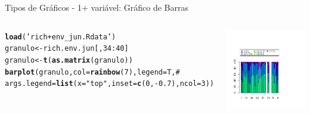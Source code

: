\documentclass{beamer}\usepackage[]{graphicx}\usepackage[]{color}
\makeatletter
\newcommand{\hlnum}[1]{\textcolor[rgb]{0.686,0.059,0.569}{#1}}%
\newcommand{\hlstr}[1]{\textcolor[rgb]{0.192,0.494,0.8}{#1}}%
\newcommand{\hlcom}[1]{\textcolor[rgb]{0.678,0.584,0.686}{\textit{#1}}}%
\newcommand{\hlopt}[1]{\textcolor[rgb]{0,0,0}{#1}}%
\newcommand{\hlstd}[1]{\textcolor[rgb]{0.345,0.345,0.345}{#1}}%
\newcommand{\hlkwb}[1]{\textcolor[rgb]{0.69,0.353,0.396}{#1}}%
\newcommand{\hlkwc}[1]{\textcolor[rgb]{0.333,0.667,0.333}{#1}}%
\newcommand{\hlkwd}[1]{\textcolor[rgb]{0.737,0.353,0.396}{\textbf{#1}}}%
\newenvironment{kframe}{%
 \def\at@end@of@kframe{}%
 \ifinner\ifhmode%
  \def\at@end@of@kframe{\end{minipage}}%
  \begin{minipage}{\columnwidth}%
 \fi\fi%
 \def\FrameCommand##1{\hskip\@totalleftmargin \hskip-\fboxsep
 \colorbox{shadecolor}{##1}\hskip-\fboxsep
     \hskip-\linewidth \hskip-\@totalleftmargin \hskip\columnwidth}%
 \MakeFramed {\advance\hsize-\width
   \@totalleftmargin\z@ \linewidth\hsize
   \@setminipage}}%
 {\par\unskip\endMakeFramed%
 \at@end@of@kframe}
\newenvironment{knitrout}{}{} %
\renewenvironment{knitrout}{\setlength{\topsep}{0mm}}{}
\makeatother
\begin{document}
\begin{frame}[fragile]{Tipos de Gráficos - 1+ variável: Gráfico de Barras}

\begin{columns}[c]


\begin{knitrout}\tiny
{}\color{fgcolor}\begin{kframe}
\begin{alltt}
\hlkwd{load}\hlstd{(}\hlstr{'rich+env_jun.Rdata'}\hlstd{)}
\hlstd{granulo} \hlkwb{<-} \hlstd{rich.env.jun[,}\hlnum{34}\hlopt{:}\hlnum{40}\hlstd{]}
\hlstd{granulo} \hlkwb{<-} \hlkwd{t}\hlstd{(}\hlkwd{as.matrix}\hlstd{(granulo))}
\hlkwd{barplot}\hlstd{(granulo,}\hlkwc{col}\hlstd{=}\hlkwd{rainbow}\hlstd{(}\hlnum{7}\hlstd{),}\hlkwc{legend}\hlstd{=T,}\hlcom{#}
    \hlkwc{args.legend} \hlstd{=} \hlkwd{list}\hlstd{(}\hlkwc{x}\hlstd{=}\hlstr{"top"}\hlstd{,} \hlkwc{inset}\hlstd{=}\hlkwd{c}\hlstd{(}\hlnum{0}\hlstd{,}\hlopt{-}\hlnum{0.7}\hlstd{),}\hlkwc{ncol}\hlstd{=}\hlnum{3}\hlstd{))}
\end{alltt}
\end{kframe}
\end{knitrout}


\begin{knitrout}
\color{fgcolor}
\includegraphics[width=1.4\linewidth]{figure/unnamed-chunk-55-1} 

\end{knitrout}

\end{columns}

\end{frame}
\end{document}

